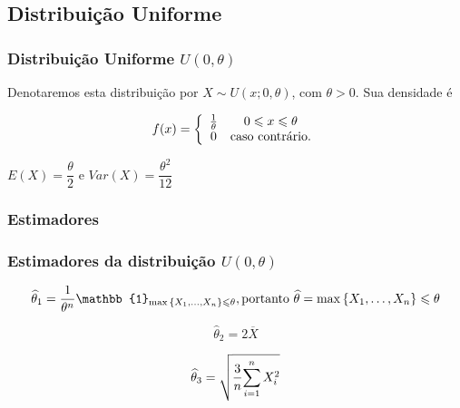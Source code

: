 \subsection{Distribuição Uniforme}
\begin{frame}
\frametitle{Distribuição Uniforme $U(0, \theta)$}
\begin{dist}[$U(0, \theta)$]
Denotaremos esta distribuição por $X\sim U(x; 0,\theta)$, com $\theta>0$. Sua densidade é

{\small $$f(x) =
\left \{
\begin{array}{cc}
\frac{1}{ \theta } & 0 \leqslant x \leqslant \theta\\
0 & \textnormal{caso contrário.} \\
\end{array}
\right.$$ }

\bigskip\bigskip

{\scriptsize $E(X)=\dfrac{\theta}{2}$\hspace{1cm} e \hspace{1cm}$Var(X)=\dfrac{\theta^{2}}{12}$ }
\end{dist}
\end{frame}

\subsubsection{Estimadores}

\begin{frame}
\frametitle{Estimadores da distribuiç\~ao $U(0, \theta)$}
\begin{emv}[$U(0, \theta)$]
$$\widehat{\theta}_{1}={\dfrac{1}{\theta ^ n }}{\mathbb{1}_{\max{\{X_1,\dots,X_n\}\leqslant\theta}}},
\textnormal{portanto } \widehat{\theta} ={\max{\{X_1,\dots,X_n\}\leqslant\theta}} $$
\end{emv}

\begin{mo1}[$U(0, \theta)$]
$$\widehat{\theta}_{2}=2\overline{X}$$
\end{mo1} 

\end{frame}

\begin{frame}
\begin{mo2}[$U(0, \theta)$]
$$\widehat{\theta}_{3} = \sqrt{{{{3} \over {n}} {\sum_{i=1}^{n} X_{i}^{2}}}} $$
\end{mo2}
\end{frame}
